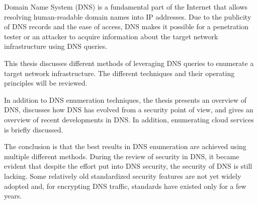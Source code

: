 %
%



\begin{enabstract}
Domain Name System (DNS) is a fundamental part of the Internet that allows resolving human-readable domain names into IP addresses. Due to the publicity of DNS records and the ease of access, DNS makes it possible for a penetration tester or an attacker to acquire information about the target network infrastructure using DNS queries.

This thesis discusses different methods of leveraging DNS queries to enumerate a target network infrastructure.
The different techniques and their operating principles will be reviewed.

In addition to DNS enumeration techniques, the thesis presents an overview of DNS, discusses how DNS has evolved from a security point of view, and gives an overview of recent developments in DNS. In addition, enumerating cloud services is briefly discussed.

The conclusion is that the best results in DNS enumeration are achieved using multiple different methods. During the review of security in DNS, it became evident that despite the effort put into DNS security, the security of DNS is still lacking. Some relatively old standardized security features are not yet widely adopted and, for encrypting DNS traffic, standards have existed only for a few years.

\end{enabstract}
